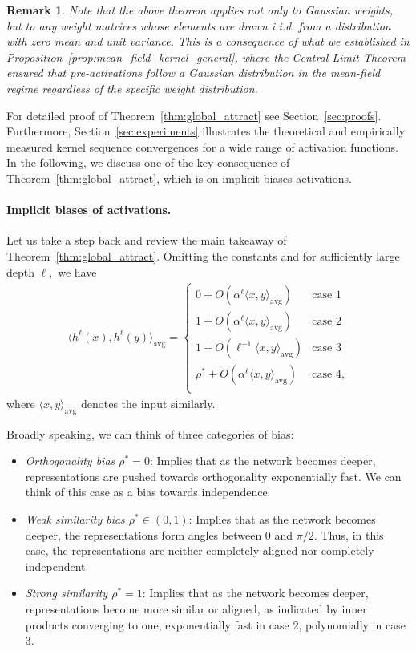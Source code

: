 \documentclass[twoside]{article}
\newcommand{\avg}{\text{avg}}
\newtheorem{remark}{Remark}
\theoremstyle{definition}
\begin{document}
\begin{remark}
    Note that the above theorem applies not only to Gaussian weights, but to \emph{any} weight matrices whose elements are drawn i.i.d. from a distribution with zero mean and unit variance. This is a consequence of what we established in Proposition~\ref{prop:mean_field_kernel_general}, where the Central Limit Theorem ensured that pre-activations follow a Gaussian distribution in the mean-field regime regardless of the specific weight distribution.
\end{remark}

For detailed proof of Theorem~\ref{thm:global_attract} see Section~\ref{sec:proofs}. Furthermore, Section~\ref{sec:experiments} illustrates the theoretical and empirically measured kernel sequence convergences for a wide range of activation functions. 
In the following, we discuss one of the key consequence of Theorem~\ref{thm:global_attract}, which is on implicit biases activations.

\paragraph{Implicit biases of activations.}  Let us take a step back and review the main takeaway of Theorem~\ref{thm:global_attract}. Omitting the constants and for sufficiently large depth $\ell,$ we have 
\begin{align*}
    \langle h^{\ell}(x), h^{\ell}(y)\rangle_\avg =  \begin{cases}
          0+ O(\alpha ^ \ell \langle x, y \rangle_\avg)  & \text{case 1}\\
         1 + O(\alpha ^ \ell \langle x, y \rangle_\avg)  & \text{case 2}\\
         1 + O \left(\ell^{-1}\langle x, y \rangle_\avg \right)   & \text{case 3}\\
         \rho^* + O(\alpha ^ \ell \langle x, y \rangle_\avg)  & \text{case 4},\\
    \end{cases}
\end{align*}
where $\langle x,y\rangle_\avg $ denotes the input similarly. 

Broadly speaking, we can think of three categories of bias:

\begin{itemize}
    \item \textit{Orthogonality bias $\rho^*=0$}: Implies that as the network becomes deeper, representations are pushed towards orthogonality exponentially fast. We can think of this case as a bias towards independence. 
    \item \textit{Weak similarity bias $\rho^*\in (0,1)$}: Implies that as the network becomes deeper, the representations form angles between $0$ and $\pi/2$. Thus, in this case, the representations are neither completely aligned nor completely independent. 
    \item \textit{Strong similarity $\rho^*=1$}: Implies that as the network becomes deeper, representations become more similar or aligned, as indicated by inner products converging to one, exponentially fast in case 2, polynomially in case 3. 
\end{itemize}
\end{document}
